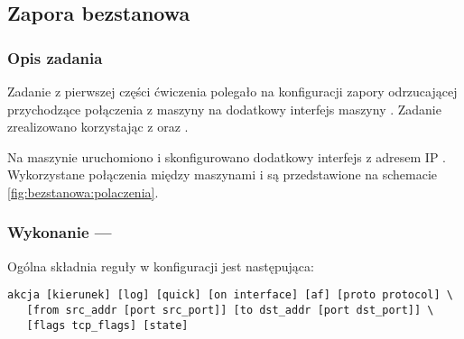 \subsection{Zapora bezstanowa}
\label{sec:bezstanowe}


\subsubsection{Opis zadania}

Zadanie z pierwszej części ćwiczenia polegało na konfiguracji zapory
odrzucającej przychodzące połączenia \ssh{} z maszyny \volt{} na dodatkowy
interfejs maszyny \kdwa. Zadanie zrealizowano korzystając z \ipfw{} oraz \pf.

Na maszynie \kdwa{} uruchomiono i skonfigurowano dodatkowy interfejs \emo{} z
adresem IP \emoip. Wykorzystane połączenia między maszynami \volt{} i \kdwa{} są
przedstawione na schemacie \ref{fig:bezstanowa:polaczenia}.




\subsubsection{Wykonanie --- \pf}
\label{bezstanowa:pf}

Ogólna składnia reguły w konfiguracji \pf{} jest następująca:

\begin{lstlisting}
akcja [kierunek] [log] [quick] [on interface] [af] [proto protocol] \
   [from src_addr [port src_port]] [to dst_addr [port dst_port]] \
   [flags tcp_flags] [state]
\end{lstlisting}

